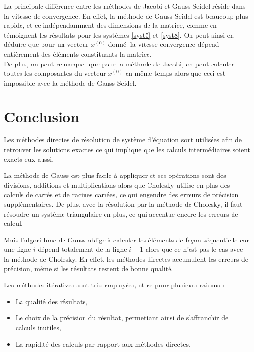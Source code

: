 \documentclass{report}
\begin{document}
        La principale différence entre les méthodes de Jacobi et Gauss-Seidel réside dans la vitesse de convergence. En effet, la méthode de Gauss-Seidel est beaucoup plus rapide, et ce indépendamment des dimensions de la matrice, comme en témoignent les résultats pour les systèmes \eqref{syst5} et \eqref{syst8}.
	On peut ainsi en déduire que pour un vecteur $x^{(0)}$ donné, la vitesse convergence dépend entièrement des éléments constituants la matrice. \\
	De plus, on peut remarquer que pour la méthode de Jacobi, on peut calculer toutes les composantes du  vecteur $x^{(0)}$ en même temps alors que ceci est impossible avec la méthode de Gauss-Seidel.
        
        
  \chapter{Conclusion}
  	Les méthodes directes de résolution de système d'équation sont utilisées afin de retrouver les solutions exactes ce qui implique que les calculs intermédiaires soient exacts eux aussi.
    \vspace{0.3cm}
    
    La méthode de Gauss est plus facile à appliquer et ses opérations sont des divisions, additions et multiplications alors que Cholesky utilise en plus des calculs de carrés et de racines carrées, ce qui engendre des erreurs de précision supplémentaires. De plus, avec la résolution par la méthode de Cholesky, il faut résoudre un système triangulaire en plus, ce qui accentue encore les erreurs de calcul.
    
    Mais l'algorithme de Gauss oblige à calculer les éléments de façon séquentielle car une ligne $i$ dépend totalement de la ligne $i-1$ alors que ce n'est pas le cas avec la méthode de Cholesky.
    En effet, les méthodes directes accumulent les erreurs de précision, même si les résultats restent de bonne qualité.

    \vspace{0.7cm}
    Les méthodes itératives sont très employées, et ce pour plusieurs raisons :
        \begin{itemize}
          \item{La qualité des résultats,}
          \item{Le choix de la précision du résultat, permettant ainsi de s'affranchir de calculs inutiles,}
          \item{La rapidité des calculs par rapport aux méthodes directes.}
        \end{itemize}
    \vspace{0.3cm}
\end{document}
